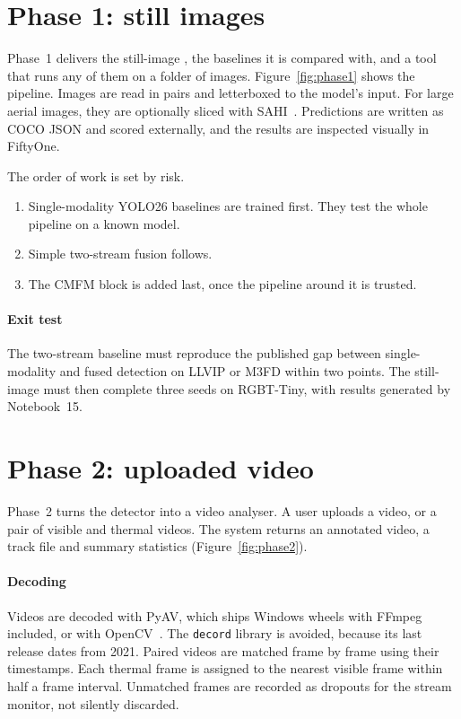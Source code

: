 \section{Phase 1: still images}
\label{sec:phase1}

Phase~1 delivers the still-image \method{}, the baselines it is compared
with, and a tool that runs any of them on a folder of images.
Figure~\ref{fig:phase1} shows the pipeline. Images are read in pairs and
letterboxed to the model's input. For large aerial images, they are
optionally sliced with SAHI~\citep{akyon2022sahi}. Predictions are written
as COCO JSON and scored externally, and the results are inspected
visually in FiftyOne.

The order of work is set by risk.
\begin{enumerate}
  \item Single-modality YOLO26 baselines are trained first. They test the
        whole pipeline on a known model.
  \item Simple two-stream fusion follows.
  \item The CMFM block is added last, once the pipeline around it is
        trusted.
\end{enumerate}

\paragraph{Exit test}
The two-stream baseline must reproduce the published gap between
single-modality and fused detection on LLVIP or M3FD within two points. The
still-image \method{} must then complete three seeds on RGBT-Tiny, with
results generated by Notebook~15.



\section{Phase 2: uploaded video}
\label{sec:phase2}

Phase~2 turns the detector into a video analyser. A user uploads a video,
or a pair of visible and thermal videos. The system returns an annotated
video, a track file and summary statistics (Figure~\ref{fig:phase2}).

\paragraph{Decoding}
Videos are decoded with PyAV, which ships Windows wheels with FFmpeg
included, or with OpenCV~\citep{pyav_repo}. The \texttt{decord} library is
avoided, because its last release dates from 2021. Paired videos are matched
frame by frame using their timestamps. Each thermal frame is assigned to
the nearest visible frame within half a frame interval. Unmatched frames
are recorded as dropouts for the stream monitor, not silently discarded.

